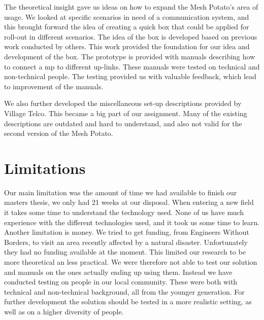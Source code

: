 The theoretical insight gave us ideas on how to expand the Mesh Potato's area of usage. We looked at specific scenarios in need of a communication system, and this brought forward the idea of creating a \gls{quick} box that could be applied for roll-out in different scenarios. The idea of the box is developed based on previous work conducted by others. This work provided the foundation for our idea and development of the box. The prototype is provided with manuals describing how to connect a \gls{mp} to different up-links. These manuals were tested on technical and non-technical people. The testing provided us with valuable feedback, which lead to improvement of the manuals. 

We also further developed the miscellaneous set-up descriptions provided by Village Telco. This became a big part of our assignment. Many of the existing descriptions are outdated and hard to understand, and also not valid for the second version of the Mesh Potato.



\section{Limitations}
Our main limitation was the amount of time we had available to finish our masters thesis, we only had 21 weeks at our disposal. When entering a new field it takes some time to understand the technology used. None of us have much experience with the different technologies used, and it took us some time to learn. Another limitation is money. We tried to get funding, from Engineers Without Borders, to visit an area recently affected by a natural disaster. Unfortunately they had no funding available at the moment. This limited our research to be more theoretical an less practical. We were therefore not able to test our solution and manuals on the ones actually ending up using them. Instead we have conducted testing on people in our local community. These were both with technical and non-technical background, all from the younger generation. For further development the solution should be tested in a more realistic setting, as well as on a higher diversity of people. 


